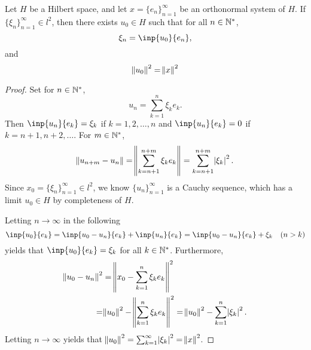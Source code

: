\begin{thm}
\label{thm:hilbert_spaces:riesz_ficsher}
Let $H$ be a Hilbert space, and let $x = \{ e_n \}_{n=1}^{\infty}$ be an 
orthonormal system of $H$. 
If $\{ \xi_n \}_{n=1}^{\infty} \in l^2$, then there exists $u_0 \in H$ 
such that for all $n \in \mathbb{N}^\ast$, 
\begin{equation*}
    \xi_n = \inp{u_0}{e_n}, 
\end{equation*}
and 
\begin{equation*}
    \norm{u_0}^2 = \norm{x}^2
\end{equation*}
\end{thm}
\begin{proof}
Set for $n \in \mathbb{N}^\ast$, 
\begin{equation*}
    u_n = \sum_{k=1}^{n} \xi_k e_k.
\end{equation*}
Then $\inp{u_n}{e_k} = \xi_k$ if $k = 1, 2, \ldots, n$ and $\inp{u_n}{e_k} 
= 0$ if $k = n+1, n+2, \ldots$. 
For $m \in \mathbb{N}^\ast$, 
\begin{equation*}
    \norm{u_{n+m} - u_{n}} = \norm{\sum_{k=n+1}^{n+m} \xi_k e_k} 
    = \sum_{k=n+1}^{n+m} \abs{\xi_k}^2.
\end{equation*}
Since $x_0 = \{ \xi_n \}_{n=1}^{\infty} \in l^2$, we know $\{ u_n \}_{n=1}
^{\infty}$ is a Cauchy sequence, which has a limit $u_0 \in H$ by 
completeness of $H$. 

Letting $n \to \infty$ in the following 
\begin{equation*}
    \inp{u_0}{e_k} = \inp{u_0 - u_n}{e_k} + \inp{u_n}{e_k} 
    = \inp{u_0 - u_n}{e_k} + \xi_k \quad (n > k)
\end{equation*}
yields that $\inp{u_0}{e_k} = \xi_k$ for all $k \in \mathbb{N}^\ast$. 
Furthermore, 
\begin{equation*}
    \begin{aligned}
        \norm{u_0 - u_n}^2 &= \norm{x_0 - \sum_{k=1}^{n} \xi_k e_k}^2 \\
        = &\norm{u_0}^2 - \norm{\sum_{k=1}^{n} \xi_k e_k}^2
        = \norm{u_0}^2 - \sum_{k=1}^{n} \abs{\xi_k}^2. 
    \end{aligned}
\end{equation*}
Letting $n \to \infty$ yields that $\norm{u_0}^2 = \sum_{k=1}^{\infty} 
\abs{\xi_k}^2 = \norm{x}^2$.
\end{proof}

